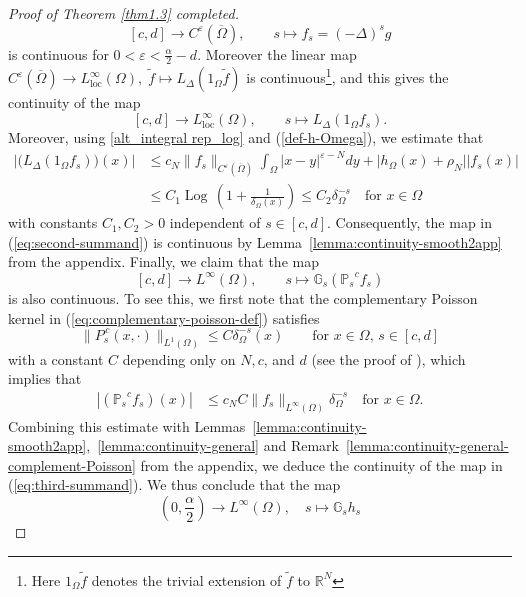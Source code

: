 \documentclass[notitlepage,11pt,reqno]{amsart}
\theoremstyle{definition}
\numberwithin{equation}{section}
\newcommand{\eps}{{\varepsilon}}
\newcommand{\cGs}{{\mathbb G}}
\newcommand{\cPs}{{{\mathbb P}_s}}
\newcommand{\loc}{\mathrm{loc}}
\newcommand{\R}{\mathds{R}}
\DeclareMathOperator*{\Log}{\text{Log}\,}
\begin{document}
\begin{proof}[Proof of Theorem \ref{thm1.3} completed]
  $$
  [c,d] \to C^\eps(\overline \Omega), \qquad s \mapsto f_s =(-\Delta)^s g
  $$
  is continuous for $0 < \eps < \frac{\alpha}{2}-d$. Moreover the linear map
  $C^\eps(\overline \Omega) \to L^\infty_{\loc}(\Omega),\;   \tilde f \mapsto L_{\Delta}(1_\Omega \tilde f)$ is continuous\footnote{Here $1_\Omega \tilde f$ denotes the trivial extension of $\tilde f$ to $\R^N$}, and this gives the continuity of the map  
  $$
  [c,d] \to L^\infty_{\loc}(\Omega), \qquad s \mapsto L_{\Delta}(1_\Omega f_s).
  $$
  Moreover, using \eqref{alt_integral rep_log} and (\ref{def-h-Omega}), we estimate that 
  \begin{align*}
    |\bigl(L_{\Delta}(1_\Omega f_s)\bigr)(x)| &\le c_N \|f_s\|_{C^\eps(\overline{\Omega})} \int_{\Omega}|x-y|^{\eps-N}dy + \bigl|h_\Omega(x) + \rho_N\bigr| |f_s(x)|\\
                                              &\le C_1 \Log (1+ \frac{1}{\delta_\Omega(x)}) \le C_2 \delta_\Omega^{-s}\quad \text{for $x \in \Omega$}
  \end{align*}
  with constants $C_1,C_2>0$ independent of $s \in [c,d]$. Consequently, the map
  in (\ref{eq:second-summand}) is continuous by Lemma~\ref{lemma:continuity-smooth2app} from the appendix. Finally, we claim that the map
      \begin{equation}
      \label{eq:third-summand}
  [c,d] \to L^\infty(\Omega), \qquad s \mapsto \cGs_s  (\cPs^{\! \! c} f_s)
    \end{equation}
    is also continuous. To see this, we first note that the complementary Poisson kernel in (\ref{eq:complementary-poisson-def}) satisfies 
  \begin{equation}
    \label{eq:complementary-poisson-est}
  \|P_s^{\,c}(x,\cdot)\|_{L^1(\Omega)}\le C \delta_{\Omega}^{-s}(x) \qquad \text{for $x \in \Omega$, $s \in [c,d]$}  
  \end{equation}
  with a constant $C$ depending only on $N,c$, and $d$ (see the proof of \cite[Lemma 2.3]{JSW25}), which implies that
  \begin{align*}
    |  (\cPs^{\!\! c} f_s)(x)| &\le c_N C \|f_s\|_{L^\infty(\Omega)} \delta_\Omega^{-s}\quad \text{for $x \in \Omega$.}
  \end{align*}
  Combining this estimate with Lemmas~\ref{lemma:continuity-smooth2app},~\ref{lemma:continuity-general} and Remark~\ref{lemma:continuity-general-complement-Poisson} from the appendix, we deduce the continuity of the map in (\ref{eq:third-summand}). We thus conclude that the map
  $$
  (0,\frac{\alpha}{2}) \to L^\infty(\Omega), \quad s \mapsto \cGs_s h_s
$$
\end{proof}
\end{document}
